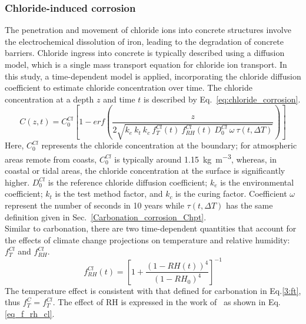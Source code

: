 \subsubsection{Chloride-induced corrosion}\label{Chloride_corrosion_Chpt}
The penetration and movement of chloride ions into concrete structures involve the electrochemical dissolution of iron, leading to the degradation of concrete barriers.
Chloride ingress into concrete is typically described using a diffusion model, which is a single mass transport equation for chloride ion transport.
In this study, a time-dependent model is applied, incorporating the chloride diffusion coefficient to estimate chloride concentration over time. The chloride concentration at a depth $z$ and time $t$ is described by Eq.~\ref{eq:chloride_corrosion}.
\begin{equation}
    \label{eq:chloride_corrosion}
    C(z, t) = C_0^{Cl} \left[ 1-erf \left(\frac{z}{2\sqrt{k_e \ k_t \ k_c \ f_T^{Cl}(t) \ f_{RH}^{Cl}(t) \ D_0^{Cl} \ \omega \ \tau(t, \Delta T)}} \right) \right]
\end{equation}
Here, $C_0^{Cl}$ represents the chloride concentration at the boundary; for atmospheric areas remote from coasts, $C_0^{Cl}$ is typically around \SI{1.15}{\kilogram\per\cubic\meter}, whereas, in coastal or tidal areas, the chloride concentration at the surface is significantly higher. $D_0^{Cl}$ is the reference chloride diffusion coefficient; $k_e$ is the environmental coefficient; $k_t$ is the test method factor, and $k_c$ is the curing factor. 
Coefficient $\omega$ represent the number of seconds in 10 years while $\tau(t, \Delta T)$ has the same definition given in Sec.~\ref{Carbonation_corrosion_Chpt}.\\
Similar to carbonation, there are two time-dependent quantities that account for the effects of climate change projections on temperature and relative humidity: $f_{T}^{Cl}$ and $f_{RH}^{Cl}$.
\begin{equation}
    \label{eq_f_rh_cl}
    f_{RH}^{Cl}(t) = \left[ 1 + \frac{(1-RH(t))^4}{(1-RH_0)^4} \right]^{-1}
\end{equation}
The temperature effect is consistent with that defined for carbonation in Eq.\ref{3:ft}, thus $f_T^C = f_T^{Cl}$. The effect of RH is expressed in the work of~\textcite{f_RH_ClELHASSAN} as shown in Eq.\ref{eq_f_rh_cl}.

